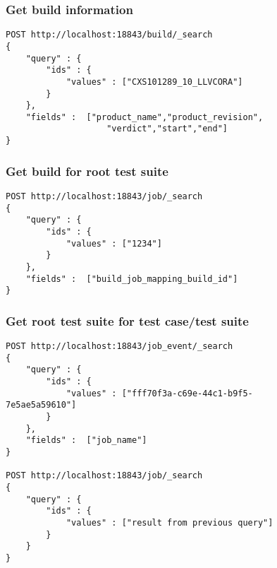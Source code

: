 \label{q:getbuildInfoEs}
\begin{figure}[H]
\subsubsection*{Get build information}
\begin{mdframed}
\begin{verbatim}
POST http://localhost:18843/build/_search
{ 
    "query" : {
        "ids" : { 
            "values" : ["CXS101289_10_LLVCORA"]
        }
    },
    "fields" :  ["product_name","product_revision",
                    "verdict","start","end"]
}
\end{verbatim}
\end{mdframed}
\end{figure}

\begin{figure}[H]
\subsubsection*{Get build for root test suite}
\begin{mdframed}
\begin{verbatim}
POST http://localhost:18843/job/_search
{ 
    "query" : {
        "ids" : { 
            "values" : ["1234"]
        }
    },
    "fields" :  ["build_job_mapping_build_id"]
}
\end{verbatim}
\end{mdframed}
\end{figure}

\label{q:getroottsEs}
\begin{figure}[]
\subsubsection*{Get root test suite for test case/test suite}
\begin{mdframed}
\begin{verbatim}
POST http://localhost:18843/job_event/_search
{ 
    "query" : {
        "ids" : { 
            "values" : ["fff70f3a-c69e-44c1-b9f5-7e5ae5a59610"]
        }
    },
    "fields" :  ["job_name"]
}

POST http://localhost:18843/job/_search
{ 
    "query" : {
        "ids" : { 
            "values" : ["result from previous query"]
        }
    }
}
\end{verbatim}
\end{mdframed}
\end{figure}

